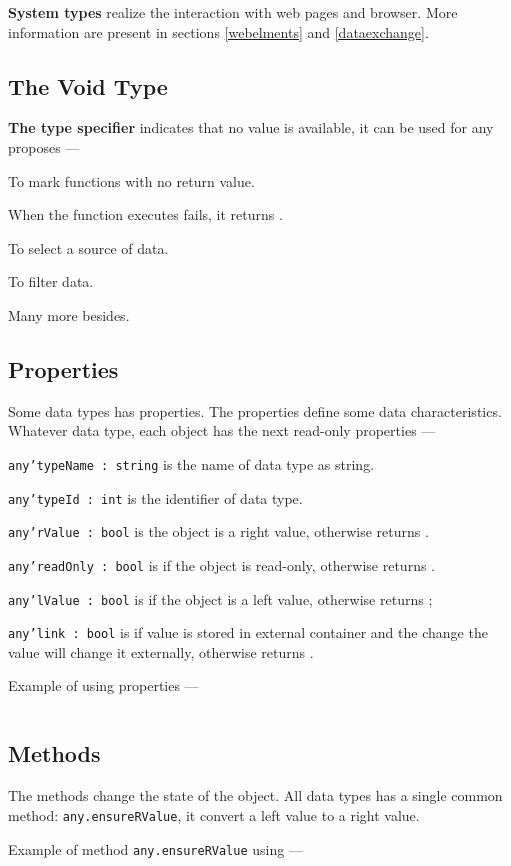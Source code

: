 {\bf System types} realize the interaction with web pages and browser. More information are present in sections \ref{webelments} and \ref{dataexchange}.

\subsection{The Void Type}

{\bf The type specifier \void{}} indicates that no value is available, it can be used for any proposes —

\begin{icItems}
\item
	To mark functions with no return value.
\item
	When the function executes fails, it returns \void.
\item
	To select a source of data.
\item
	To filter data.
\item
	Many more besides.
\end{icItems}


\subsection{Properties}

Some data types has properties. The properties define some data characteristics.  Whatever data type, each object has the next read-only properties —

\begin{icItems}
\item
	\texttt{any'typeName : string} is the name of data type as string.
\item
	\texttt{any'typeId : int} is the identifier of data type.
\item
	\texttt{any'rValue : bool} is \true{} the object is a right value, otherwise returns \false{}.
\item
	\texttt{any'readOnly : bool} is \true{} if the object is read-only, otherwise returns \false{}.
\item
	\texttt{any'lValue : bool} is \true{} if the object is a left value, otherwise returns \false{};
\item
	\texttt{any'link : bool} is \true{} if value is stored in external container and the change the value will change it externally, otherwise returns \false{}.
\end{icItems}

Example of using properties —
\inputminted[linenos]{icl}{../sources/propertiesmain.icL}

\subsection{Methods}

The methods change the state of the object. All data types has a single common method: \texttt{any.ensureRValue}, it convert a left value to a right value.

Example of method \texttt{any.ensureRValue} using —
\inputminted[linenos]{icl}{../sources/anyensureRValue.icL}
